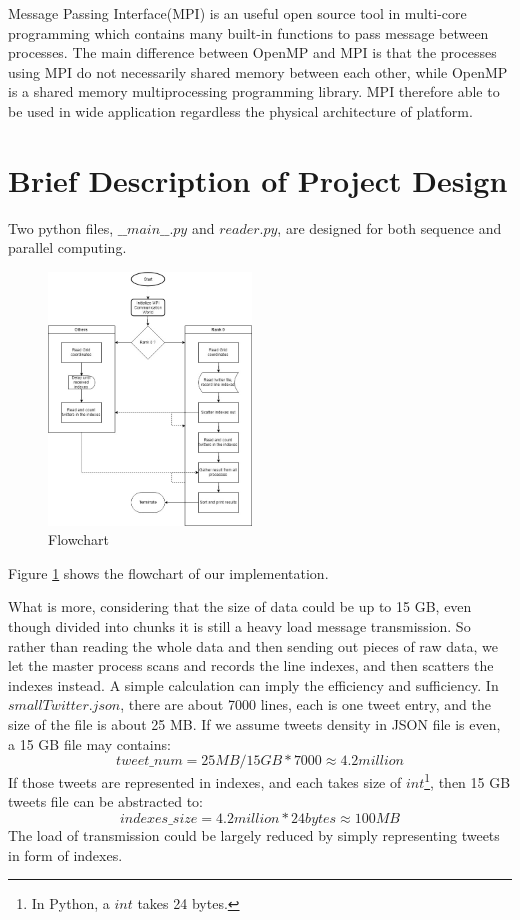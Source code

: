 \documentclass[11pt]{article}
\begin{document}
Message Passing Interface(MPI) is an useful open source tool in multi-core programming which contains many built-in functions to pass message between processes. The main difference between OpenMP and MPI is that the processes using MPI do not necessarily shared memory between each other, while OpenMP is a shared memory multiprocessing programming library.  MPI therefore able to be used in wide application regardless the physical architecture of platform.

\section{Brief Description of Project Design}
Two python files, $\_\_main\_\_.py$ and $reader.py$, are designed for both sequence and parallel computing.

\begin{figure}[h]
\includegraphics[width=0.48\textwidth]{process}
\caption{Flowchart}
\label{fig:flowchart}
\end{figure}

Figure \ref{fig:flowchart} shows the flowchart of our implementation.

What is more, considering that the size of data could be up to 15 GB, even though divided into chunks it is still a heavy load message transmission. So rather than reading the whole data and then sending out pieces of raw data, we let the master process scans and records the line indexes, and then scatters the indexes instead. A simple calculation can imply the efficiency and sufficiency. In $smallTwitter.json$, there are about 7000 lines, each is one tweet entry, and the size of the file is about 25 MB. If we assume tweets density in JSON file is even, a 15 GB file may contains: \[tweet\_num = 25MB / 15GB * 7000 \approx 4.2million\] If those tweets are represented in indexes, and each takes size of $int$\footnote{In Python, a $int$ takes 24 bytes.}, then 15 GB tweets file can be abstracted to: \[indexes\_size = 4.2million * 24bytes \approx 100MB \] The load of transmission could be largely reduced by simply representing tweets in form of indexes.
\end{document}
